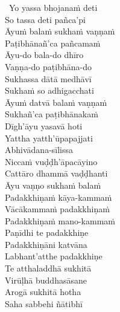 \begin{verses}
  \anglebracketleft\ \hspace{-0.5mm}Yo yassa bhojanaṁ deti \hspace{-0.5mm}\anglebracketright\ \\
  So tassa deti pañca'pi\\
  Āyuṁ balaṁ sukhaṁ vaṇṇaṁ\\
  Paṭibhānañ'ca pañcamaṁ\makeatletter\hyperlink{endnote122-appendix}\makeatother\\
  Āyu-do bala-do dhīro\\
  Vaṇṇa-do paṭibhāna-do\\
  Sukhassa dātā medhāvī\\
  Sukhaṁ so adhigacchati\\
  Āyuṁ datvā balaṁ vaṇṇaṁ\\
  Sukhañ'ca paṭibhānakaṁ\makeatletter\hyperlink{endnote123-appendix}\makeatother\\
  Dīgh'āyu yasavā hoti\\
  Yattha yatth'ūpapajjati\\
  Abhivādana-sīlissa\\
  Niccaṁ vuḍḍh'āpacāyino\\
  Cattāro dhammā vaḍḍhanti\\
  Āyu vaṇṇo sukhaṁ balaṁ\\
  Padakkhiṇaṁ kāya-kammaṁ\\
  Vācākammaṁ padakkhiṇaṁ\\
  Padakkhiṇaṁ mano-kammaṁ\\
  Paṇīdhi te padakkhiṇe\\
  Padakkhiṇāni katvāna\\
  Labhant'atthe padakkhiṇe\\
  Te atthaladdhā sukhitā\\
  Virūḷhā buddhasāsane\\
  Arogā sukhitā hotha\\
  Saha sabbehi ñātibhī
\end{verses}

